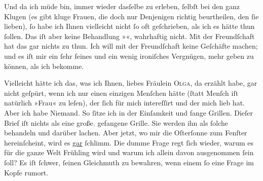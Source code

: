 \pstart
           Und da ich müde bin, immer wieder dasſelbe zu erleben, ſelbſt bei den ganz Klugen (es
               gibt kluge Frauen, die doch {\pb}nur Denjenigen richtig
               beurtheilen, den ſie lieben), ſo habe ich Ihnen vielleicht nicht ſo oft geſchrieben,
               als ich es hätte thun ſollen. Das iſt aber keine Behandlung »\label{K_L03524-1v}\label{K_L03524-1}«,
               wahrhaftig nicht. Mit der Freundſchaft hat das gar nichts zu thun. Ich will mit der
               Freundſchaft keine Geſchäfte machen; und es iſt mir ein ſehr feines und ein wenig
               ironiſches Vergnügen, mehr geben zu können, als ich bekomme.\pend
           
\pstart
           Vielleicht hätte ich das, was ich Ihnen, liebes Fräulein \textsc{Olga}, da erzählt habe, gar nicht geſpürt, wenn ich \strikeout{\textcolor{gray}{×}} nur einen einzigen Menſchen hätte (ſtatt Menſch iſt natürlich »Frau« zu
               leſen), der ſich für mich intereſſirt und der mich lieb hat. Aber ich habe {\pb}Niemand. So ſitze ich in der Einſamkeit und fange
               Grillen. Dieſer Brief iſt nichts als eine große\textcolor{gray}{,} gefangene Grille.
               Sie werden ihn als ſolche behandeln und darüber lachen. Aber jetzt, wo mir die Oſterſonne zum Fenſter hereinſcheint, wird es \uline{gar} ſchlimm. Die dumme Frage regt ſich wieder, warum
               es für die ganze Welt Frühling wird und warum ich allein davon ausgenommen ſein ſoll?
               Es iſt ſchwer, ſeinen Gleichmuth zu bewahren, wenn einem ſo eine Frage im Kopfe
               rumort.\pend
           
